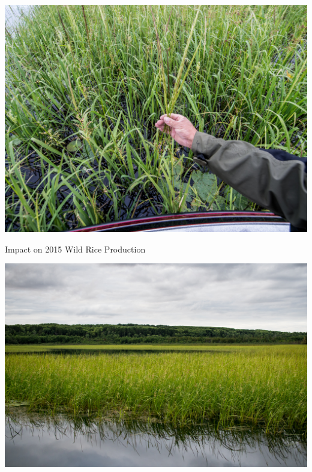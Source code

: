 \documentclass[compress,english]{beamer}
\begin{document}
{{{{%

{{\usebackgroundtemplate%
	{\includegraphics[height=\paperheight]{20150804_194209.jpg}}

\begin{frame}{Impact on 2015 Wild Rice Production}

\end{frame}
}


{{\usebackgroundtemplate%
	{\includegraphics[height=\paperheight]{20150804_195914.jpg}}

\begin{frame}{}


\end{frame}}}}}}}}
\end{document}
